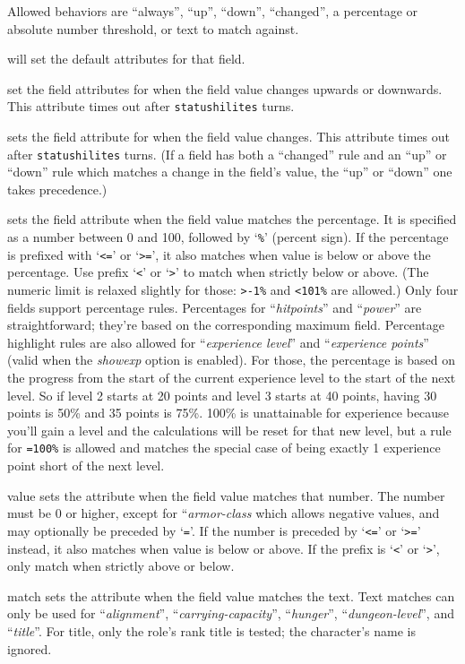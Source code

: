 Allowed behaviors are ``always'', ``up'', ``down'', ``changed'', a
percentage or absolute number threshold, or text to match against.

\blist{}
\item[{\tt always}] will set the default attributes for that field.
\item[{\tt up}{\normalfont, }{\tt down}] set the field attributes
for when the field value changes upwards or downwards. This attribute
times out after {\tt statushilites} turns.
\item[{\tt changed}] sets the field attribute for when the field value
changes. This attribute times out after {\tt statushilites} turns.
(If a field has both a ``changed'' rule and an ``up'' or ``down''
rule which matches a change in the field's value,
the ``up'' or ``down'' one takes precedence.)
\item[{\tt percentage}] sets the field attribute when the field value
matches the percentage.
It is specified as a number between 0 and 100, followed by `{\tt \%}'
(percent sign).
If the percentage is prefixed with `{\tt <=}' or `{\tt >=}',
it also matches when value is below or above the percentage.
Use prefix `{\tt <}' or `{\tt >}' to match when strictly below or above.
(The numeric limit is relaxed slightly for those: {\tt >-1\%}
and {\tt <101\%} are allowed.)
Only four fields support percentage rules.
Percentages for ``{\it hitpoints\/}'' and ``{\it power\/}'' are
straightforward; they're based on the corresponding maximum field.
Percentage highlight rules are also allowed for ``{\it experience level\/}''
and ``{\it experience points\/}'' (valid when the
{\it showexp\/}
option is enabled).
For those, the percentage is based on the progress from the start of
the current experience level to the start of the next level.
So if level 2 starts at 20 points and level 3 starts at 40 points,
having 30 points is 50\% and 35 points is 75\%.
100\% is unattainable for experience because you'll gain a level and
the calculations will be reset for that new level, but a rule for
{\tt =100\%} is allowed and matches the special case of being
exactly 1 experience point short of the next level.
\item[{\tt absolute}] value sets the attribute when the field value
matches that number.
The number must be 0 or higher, except for ``{\it armor-class\/} which
allows negative values, and may optionally be preceded by `{\tt =}'.
If the number is preceded by `{\tt <=}' or `{\tt >=}' instead,
it also matches when value is below or above.
If the prefix is `{\tt <}' or `{\tt >}', only match when strictly
above or below.
\item[{\tt text}] match sets the attribute when the field value matches the text.
Text matches can only be used for ``{\it alignment\/}'',
``{\it carrying-capacity\/}'', ``{\it hunger\/}'', ``{\it dungeon-level\/}'',
and ``{\it title\/}''.
For title, only the role's rank title
is tested; the character's name is ignored.
\elist

